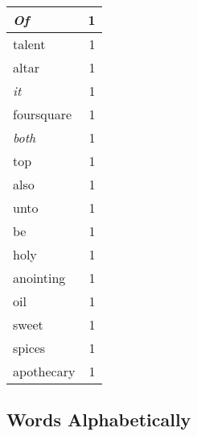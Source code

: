 \begin{center}
\begin{longtable}{l|r}
\emph{Of} & 1 \\ \hline
talent & 1 \\ \hline
altar & 1 \\ \hline
\emph{it} & 1 \\ \hline
foursquare & 1 \\ \hline
\emph{both} & 1 \\ \hline
top & 1 \\ \hline
also & 1 \\ \hline
unto & 1 \\ \hline
be & 1 \\ \hline
holy & 1 \\ \hline
anointing & 1 \\ \hline
oil & 1 \\ \hline
sweet & 1 \\ \hline
spices & 1 \\ \hline
apothecary & 1 \\ \hline
\end{longtable}
\end{center}



\normalsize



\subsection{Words Alphabetically}


